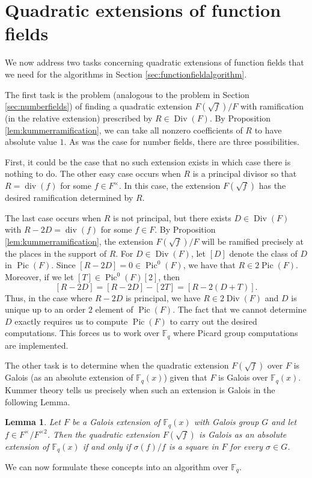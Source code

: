 \documentclass{dcthesis}
\newcommand{\FF}{\mathbb{F}}
\DeclareMathOperator{\Div}{Div}
\DeclareMathOperator{\Pic}{Pic}
\DeclareMathOperator{\ddiv}{div}
\numberwithin{equation}{section}
\newtheorem{lemma}[equation]{Lemma}
\theoremstyle{definition}
\theoremstyle{remark}
\begin{document}
{{  \section{Quadratic extensions of function fields}{
    \label{sec:functionfieldextensions}
    We now address two tasks concerning
    quadratic extensions of function fields
    that we need for the algorithms
    in Section \ref{sec:functionfieldalgorithm}.
    \par
    The first task is the problem
    (analogous to the problem in Section
    \ref{sec:numberfields})
    of
    finding a quadratic extension $F(\sqrt{f})/F$
    with ramification
    (in the relative extension)
    prescribed by
    $R\in\Div(F)$.
    By Proposition
    \ref{lem:kummerramification},
    we can take all nonzero coefficients
    of $R$ to have absolute value $1$.
    As was the case for number fields,
    there are three possibilities.
    \par
    First, it could be the case that no such
    extension exists in which case
    there is nothing to do.
    The other easy case occurs when $R$ is
    a principal divisor so that
    $R = \ddiv(f)$ for some $f\in F^\times$.
    In this case, the extension
    $F(\sqrt{f})$ has the desired ramification
    determined by $R$.
    \par
    The last case occurs when $R$
    is not principal, but there exists
    $D\in\Div(F)$ with $R-2D=\ddiv(f)$
    for some $f\in F$.
    By
    Proposition \ref{lem:kummerramification},
    the extension $F(\sqrt{f})/F$
    will be ramified precisely at the
    places in the
    support of
    $R$.
    For $D\in\Div(F)$,
    let $[D]$ denote the class of $D$
    in $\Pic(F)$.
    Since $[R-2D]=0\in\Pic^0(F)$,
    we have that $R\in 2\Pic(F)$.
    Moreover,
    if we let $[T]\in\Pic^0(F)[2]$,
    then
    \begin{equation}
      \label{eqn:twotorsionpoint}
      [R-2D] = [R-2D]-[2T] = [R-2(D+T)].
    \end{equation}
    Thus,
    in the case where $R-2D$ is principal,
    we have $R\in 2\Div(F)$
    and $D$ is unique up to an order $2$
    element of $\Pic(F)$.
    The fact that we cannot determine $D$
    exactly requires us to compute
    $\Pic(F)$ to carry out the desired
    computations.
    This forces us to work over $\FF_q$
    where Picard group computations
    are implemented.
    \par
    The other task is to determine
    when the quadratic extension
    $F(\sqrt{f})$ over $F$ is Galois
    (as an absolute extension of $\FF_q(x)$)
    given that $F$ is Galois
    over $\FF_q(x)$.
    Kummer theory tells us precisely when
    such an extension is Galois in the following
    Lemma.
    \begin{lemma}
      \label{lem:isgalois}
      Let $F$ be a Galois extension of
      $\FF_q(x)$
      with Galois group $G$ and
      let $f\in F^\times/F^{\times 2}$.
      Then the quadratic extension
      $F(\sqrt{f})$ is Galois
      as an absolute extension of
      $\FF_q(x)$ if and only if
      $\sigma(f)/f$ is a square
      in $F$
      for every $\sigma\in G$.
    \end{lemma}
    We can now formulate these concepts
    into an algorithm over $\FF_q$.
  }
}}
\end{document}
